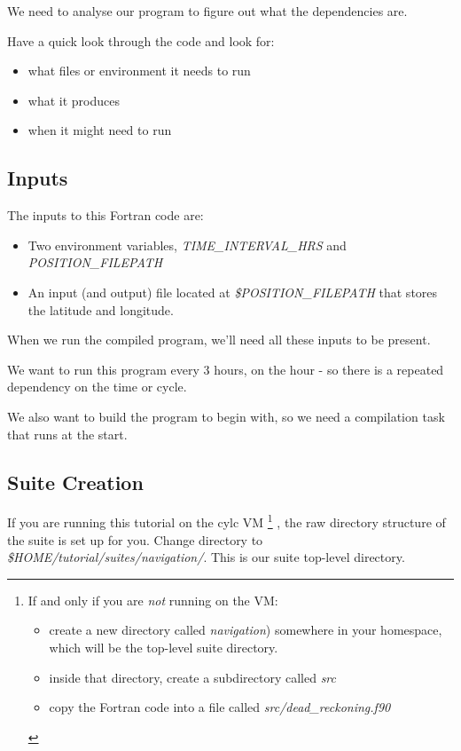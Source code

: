 We need to analyse our program to figure out what the dependencies are.

Have a quick look through the code and look for:
\begin{itemize}
    \item what files or environment it needs to run
    \item what it produces
    \item when it might need to run
\end{itemize}

\subsection{Inputs}

The inputs to this Fortran code are:
\begin{itemize}
    \item Two environment variables, {\em TIME\_INTERVAL\_HRS} and {\em POSITION\_FILEPATH}
    \item An input (and output) file located at {\em \$POSITION\_FILEPATH} that stores the latitude and longitude.
\end{itemize}

When we run the compiled program, we'll need all these inputs to be present.

We want to run this program every 3 hours, on the hour - so there is a repeated dependency on the time or cycle.

We also want to build the program to begin with, so we need a compilation task that runs at the start.

\subsection{Suite Creation}

If you are running this tutorial on the cylc VM \footnote{
    If and only if you are {\em not} running on the VM:
\begin{itemize}
    \item create a new directory called {\em navigation}) somewhere in your homespace, which will be the top-level suite directory.
    \item inside that directory, create a subdirectory called {\em src}
    \item copy the Fortran code into a file called {\em src/dead\_reckoning.f90}
\end{itemize}
} , the raw directory structure of the suite is set up for you. Change directory to {\em \$HOME/tutorial/suites/navigation/}. This is our suite top-level directory.

